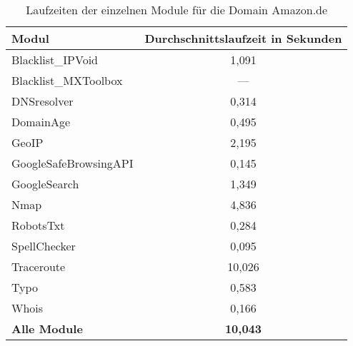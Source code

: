 \begin{table}
    \begin{center}
        \begin{tabular}{ l c }
            \toprule
            \textbf{Modul} & \textbf{Durchschnittslaufzeit in Sekunden}\\
            \midrule
            Blacklist\_IPVoid       & 1,091 \\
            Blacklist\_MXToolbox    & --- \\          
            DNSresolver            & 0,314 \\
            DomainAge               & 0,495 \\
            GeoIP                   & 2,195 \\
            GoogleSafeBrowsingAPI   & 0,145 \\
            GoogleSearch            & 1,349 \\
            Nmap                    & 4,836 \\
            RobotsTxt               & 0,284 \\
            SpellChecker            & 0,095 \\
            Traceroute              & 10,026 \\
            Typo                    & 0,583 \\
            Whois                   & 0,166 \\
            \midrule
            \textbf{Alle Module}    & \textbf{10,043} \\
            \bottomrule
        \end{tabular}
        \caption{Laufzeiten der einzelnen Module für die Domain Amazon.de}\label{tab.laufzeit}
    \end{center}
\end{table}


